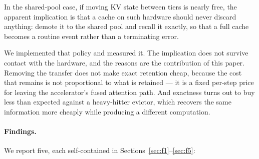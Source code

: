 \documentclass[manuscript,anonymous,review]{acmart}
\begin{document}
In the shared-pool case, if moving KV state between tiers is nearly
free, the apparent implication is that a cache on such hardware should
never discard anything: demote it to the shared pool and recall it
exactly, so that a full cache becomes a routine event rather than a
terminating error.

We implemented that policy and measured it. The implication does not
survive contact with the hardware, and the reasons are the contribution
of this paper. Removing the transfer does not make exact retention
cheap, because the cost that remains is not proportional to what is
retained --- it is a fixed per-step price for leaving the
accelerator's fused attention path. And exactness turns out to buy less
than expected against a heavy-hitter evictor, which recovers the same
information more cheaply while producing a different computation.

\paragraph{Findings.} We report five, each self-contained in
Sections~\ref{sec:f1}--\ref{sec:f5}:
\end{document}
